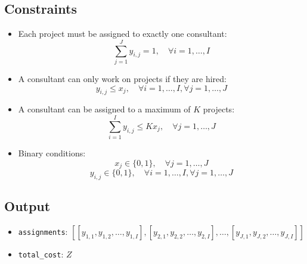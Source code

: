 \documentclass{article}
\begin{document}
\subsection*{Constraints}
\begin{itemize}
    \item Each project must be assigned to exactly one consultant:
    \[
    \sum_{j=1}^{J} y_{i,j} = 1, \quad \forall i = 1, \ldots, I
    \]

    \item A consultant can only work on projects if they are hired:
    \[
    y_{i,j} \leq x_{j}, \quad \forall i = 1, \ldots, I, \forall j = 1, \ldots, J
    \]

    \item A consultant can be assigned to a maximum of $K$ projects:
    \[
    \sum_{i=1}^{I} y_{i,j} \leq K x_{j}, \quad \forall j = 1, \ldots, J
    \]

    \item Binary conditions:
    \[
    x_j \in \{0,1\}, \quad \forall j = 1, \ldots, J
    \]
    \[
    y_{i,j} \in \{0,1\}, \quad \forall i = 1, \ldots, I, \forall j = 1, \ldots, J
    \]
\end{itemize}

\subsection*{Output}
\begin{itemize}
    \item \texttt{assignments}: $[ [y_{1,1}, y_{1,2}, \ldots, y_{1,I}], [y_{2,1}, y_{2,2}, \ldots, y_{2,I}], \ldots, [y_{J,1}, y_{J,2}, \ldots, y_{J,I}] ]$
    \item \texttt{total\_cost}: $Z$
\end{itemize}
\end{document}
